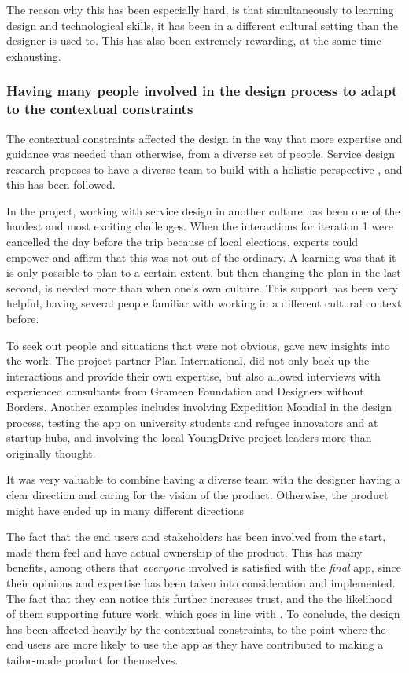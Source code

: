   The reason why this has been especially hard, is that simultaneously to learning design and technological skills, it has been in a different cultural setting than the designer is used to. This has also been extremely rewarding, at the same time exhausting.

  \subsubsection{Having many people involved in the design process to adapt to the contextual constraints}

  The contextual constraints affected the design in the way that more expertise and guidance was needed than otherwise, from a diverse set of people. Service design research proposes to have a diverse team to build with a holistic perspective \citep{stickdorn}, and this has been followed.

  In the project, working with service design in another culture has been one of the hardest and most exciting challenges. When the interactions for iteration 1 were cancelled the day before the trip because of local elections, experts could empower and affirm that this was not out of the ordinary. A learning was that it is only possible to plan to a certain extent, but then changing the plan in the last second, is needed more than when one's own culture. This support has been very helpful, having several people familiar with working in a different cultural context before.


  To seek out people and situations that were not obvious, gave new insights into the work.  The project partner Plan International, did not only back up the interactions and provide their own expertise, but also allowed interviews with experienced consultants from Grameen Foundation and Designers without Borders. Another examples includes involving Expedition Mondial in the design process, testing the app on university students and refugee innovators and at startup hubs, and involving the local YoungDrive project leaders more than originally thought.

  It was very valuable to combine having a diverse team with the designer having a clear direction and caring for the vision of the product. Otherwise, the product might have ended up in many different directions

  The fact that the end users and stakeholders has been involved from the start, made them feel and have actual ownership of the product. This has many benefits, among others that \textit{everyone} involved is satisfied with the \textit{final} app, since their opinions and expertise has been taken into consideration and implemented. The fact that they can notice this further increases trust, and the the likelihood of them supporting future work, which goes in line with \cite{stickdorn}. To conclude, the design has been affected heavily by the contextual constraints, to the point where the end users are more likely to use the app as they have contributed to making a tailor-made product for themselves.

